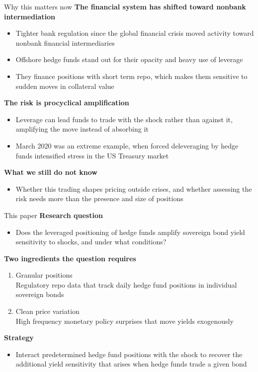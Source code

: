 \documentclass[aspectratio=169,10pt]{beamer}
\def\hibl{\textcolor{goetheblue}}
\def\hird{\textcolor{accentred}}
\newcommand{\svs}{\vspace{0.18cm}}
\newcommand{\bit}{\begin{itemize}}
\newcommand{\eit}{\end{itemize}}
\newcommand{\ben}{\begin{enumerate}}
\newcommand{\een}{\end{enumerate}}
\newcommand{\lead}[1]{{\bfseries #1}\par\nopagebreak}
\begin{document}
\begin{frame}{Why this matters now}
\svs
\lead{The financial system has shifted toward nonbank intermediation}
\bit\itemsep3pt
  \item Tighter bank regulation since the global financial crisis moved activity toward nonbank financial intermediaries {\scriptsize\color{softgrey}\citep{pelizzon2025nbfi}}
  \item Offshore hedge funds stand out for their \hird{opacity} and heavy use of \hird{leverage} {\scriptsize\color{softgrey}\citep{barth2025cross, aramonte2023}}
  \item They finance positions with short term repo, which makes them sensitive to sudden moves in collateral value
\eit
\svs
\lead{The risk is procyclical amplification}
\bit\itemsep3pt
  \item Leverage can lead funds to trade with the shock rather than against it, amplifying the move instead of absorbing it
  \item March 2020 was an extreme example, when forced deleveraging by hedge funds intensified stress in the US Treasury market {\scriptsize\color{softgrey}\citep{barth2025, kruttli2025}}
\eit
\svs
\lead{What we still do not know}
\bit
  \item Whether this trading shapes pricing \hibl{outside crises}, and whether assessing the risk needs more than the presence and size of positions
\eit
\end{frame}

\begin{frame}{This paper}
\svs
\lead{Research question}
\bit
  \item Does the leveraged positioning of hedge funds amplify sovereign bond yield sensitivity to shocks, and under what conditions?
\eit
\svs
\lead{Two ingredients the question requires}
\ben\itemsep3pt
  \item Granular positions \\
        {\footnotesize Regulatory repo data that track daily hedge fund positions in individual sovereign bonds}
  \item Clean price variation \\
        {\footnotesize High frequency monetary policy surprises that move yields exogenously {\scriptsize\color{softgrey}\citep{altavilla2019}}}
\een
\svs
\lead{Strategy}
\bit
  \item Interact \hibl{predetermined} hedge fund positions with the shock to recover the additional yield sensitivity that arises when hedge funds trade a given bond
\eit
\end{frame}
\end{document}
